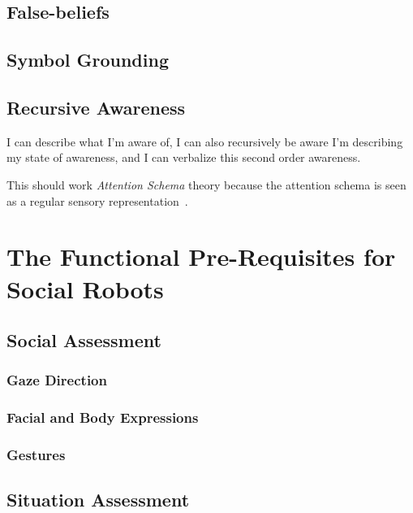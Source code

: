 \documentclass[a4paper]{article}
\begin{document}
\subsection{False-beliefs}

\subsection{Symbol Grounding}

\subsection{Recursive Awareness}

I can describe what I'm aware of, I can also recursively be aware I'm describing
my state of awareness, and I can verbalize this second order awareness.

This should work \emph{Attention Schema} theory because the attention schema
is seen as a regular sensory
representation~\citep[p.55]{graziano2013consciousness}.


\section{The Functional Pre-Requisites for Social Robots}

\subsection{Social Assessment}
\subsubsection{Gaze Direction}
\subsubsection{Facial and Body Expressions}
\subsubsection{Gestures}

\subsection{Situation Assessment}
\end{document}
